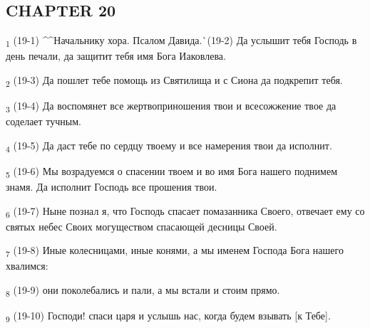 \subsection{CHAPTER 20}
\begin{tcolorbox}
\textsubscript{1} (19-1) ^^Начальнику хора. Псалом Давида.^^ (19-2) Да услышит тебя Господь в день печали, да защитит тебя имя Бога Иаковлева.
\end{tcolorbox}
\begin{tcolorbox}
\textsubscript{2} (19-3) Да пошлет тебе помощь из Святилища и с Сиона да подкрепит тебя.
\end{tcolorbox}
\begin{tcolorbox}
\textsubscript{3} (19-4) Да воспомянет все жертвоприношения твои и всесожжение твое да соделает тучным.
\end{tcolorbox}
\begin{tcolorbox}
\textsubscript{4} (19-5) Да даст тебе по сердцу твоему и все намерения твои да исполнит.
\end{tcolorbox}
\begin{tcolorbox}
\textsubscript{5} (19-6) Мы возрадуемся о спасении твоем и во имя Бога нашего поднимем знамя. Да исполнит Господь все прошения твои.
\end{tcolorbox}
\begin{tcolorbox}
\textsubscript{6} (19-7) Ныне познал я, что Господь спасает помазанника Своего, отвечает ему со святых небес Своих могуществом спасающей десницы Своей.
\end{tcolorbox}
\begin{tcolorbox}
\textsubscript{7} (19-8) Иные колесницами, иные конями, а мы именем Господа Бога нашего хвалимся:
\end{tcolorbox}
\begin{tcolorbox}
\textsubscript{8} (19-9) они поколебались и пали, а мы встали и стоим прямо.
\end{tcolorbox}
\begin{tcolorbox}
\textsubscript{9} (19-10) Господи! спаси царя и услышь нас, когда будем взывать [к Тебе].
\end{tcolorbox}
